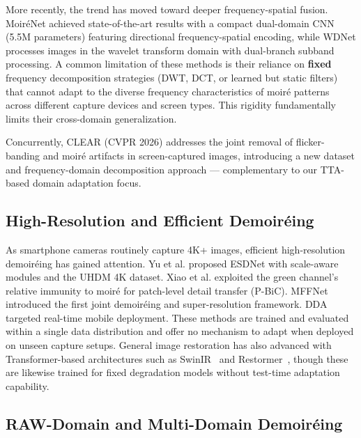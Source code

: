 \documentclass[review,10pt]{elsarticle}
\begin{document}
More recently, the trend has moved toward deeper frequency-spatial fusion. Moir\'{e}Net \cite{guo2025moirenet} achieved state-of-the-art results with a compact dual-domain CNN (5.5M parameters) featuring directional frequency-spatial encoding, while WDNet \cite{liu2020wavelet} processes images in the wavelet transform domain with dual-branch subband processing. A common limitation of these methods is their reliance on \textbf{fixed} frequency decomposition strategies (DWT, DCT, or learned but static filters) that cannot adapt to the diverse frequency characteristics of moir\'{e} patterns across different capture devices and screen types. This rigidity fundamentally limits their cross-domain generalization.

Concurrently, CLEAR \cite{zhu2026clear} (CVPR 2026) addresses the joint removal of flicker-banding and moir\'{e} artifacts in screen-captured images, introducing a new dataset and frequency-domain decomposition approach --- complementary to our TTA-based domain adaptation focus.

\subsection{High-Resolution and Efficient Demoir\'{e}ing}

As smartphone cameras routinely capture 4K+ images, efficient high-resolution demoir\'{e}ing has gained attention. Yu et al. \cite{yu2022towards} proposed ESDNet with scale-aware modules and the UHDM 4K dataset. Xiao et al. \cite{xiao2024pbic} exploited the green channel's relative immunity to moir\'{e} for patch-level detail transfer (P-BiC). MFFNet \cite{chen2025mffnet} introduced the first joint demoir\'{e}ing and super-resolution framework. DDA \cite{zhang2023dda} targeted real-time mobile deployment. These methods are trained and evaluated within a single data distribution and offer no mechanism to adapt when deployed on unseen capture setups. General image restoration has also advanced with Transformer-based architectures such as SwinIR~\cite{liang2021swinir} and Restormer~\cite{zamir2022restormer}, though these are likewise trained for fixed degradation models without test-time adaptation capability.

\subsection{RAW-Domain and Multi-Domain Demoir\'{e}ing}
\end{document}
